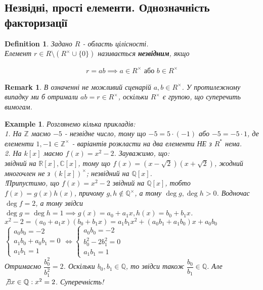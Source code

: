 \documentclass[a4paper, 14pt]{extarticle}
\theoremstyle{theoremdd}
\theoremstyle{theoremdd}
\newtheorem{definition}[theorem]{Definition}
\theoremstyle{theoremdd}
\theoremstyle{theoremdd}
\newtheorem{example}[theorem]{Example}
\theoremstyle{theoremdd}
\theoremstyle{theoremdd}
\newtheorem{remark}[theorem]{Remark}
\theoremstyle{theoremdd}
\theoremstyle{theoremdd}
\begin{document}
\subsection{Незвідні, прості елементи. Однозначність факторизації}
\begin{definition}
Задано $R$ - область цілісності.\\
Елемент $r \in R \setminus (R^\times \cup \{0\})$ називається \textbf{незвідним}, якщо
\iffalse $r \not\in R^*$, а також
\begin{align*}
a | r \implies a \in R^* \text{ або } a \in R^*r
\end{align*}
Але більше подобається еквівалетне йому означення:
\fi
\begin{align*}
r = ab \implies a \in R^\times \text{ або } b \in R^\times
\end{align*}
\end{definition}

\begin{remark}
В означенні не можливий сценарій $a,b \in R^\times$. У протилежному випадку ми б отримали $ab = r \in R^\times$, оскільки $R^\times$ є групою, що суперечить вимогам.
\end{remark}

\begin{example}
Розглянемо кілька прикладів:\\
1. На $\mathbb{Z}$ маємо $-5$ - незвідне число, тому що $-5 = 5 \cdot (-1)$ або $-5 = -5 \cdot 1$, де елементи $1,-1 \in \mathbb{Z}^\times$ - варіантів розкласти на два елементи НЕ з $R^*$ нема.
\bigskip \\
2. На $k[x]$ маємо $f(x) = x^2 - 2$. Зауважимо, що:\\
звідний на $\mathbb{R}[x], \mathbb{C}[x]$, тому що $f(x) = (x-\sqrt{2})(x+\sqrt{2})$, жодний многочлен не з $(k[x])^\times$;
незвідний на $\mathbb{Q}[x]$.
\bigskip \\
!Припустимо, що $f(x) = x^2-2$ звідний на $\mathbb{Q}[x]$, тобто $f(x) = g(x)h(x)$, причому $g,h \not \in \mathbb{Q}^\times$, а тому $\deg g, \deg h > 0$. Водночас $\deg f = 2$, а тому звідси $\deg g = \deg h = 1 \implies g(x) = a_0 + a_1x, h(x) = b_0 + b_1x$.\\
$x^2 - 2 = (a_0+a_1x)(b_0+b_1x) = a_1b_1x^2 + (a_0b_1+a_1b_0)x + a_0b_0$\\
$\begin{cases} 
a_0b_0 = -2 \\
a_1b_0+a_0b_1 = 0 \\
a_1b_1 = 1
\end{cases} \iff \begin{cases} 
a_0b_0 = -2 \\
b_0^2-2b_1^2 = 0 \\
a_1b_1 = 1
\end{cases}$\\
Отримаємо $\dfrac{b_0^2}{b_1^2} = 2$. Оскільки $b_0,b_1 \in \mathbb{Q}$, то звідси також $\dfrac{b_0}{b_1} \in \mathbb{Q}$. Але $\not\exists x \in \mathbb{Q}: x^2 = 2$. Суперечність!
\end{example}
\end{document}
